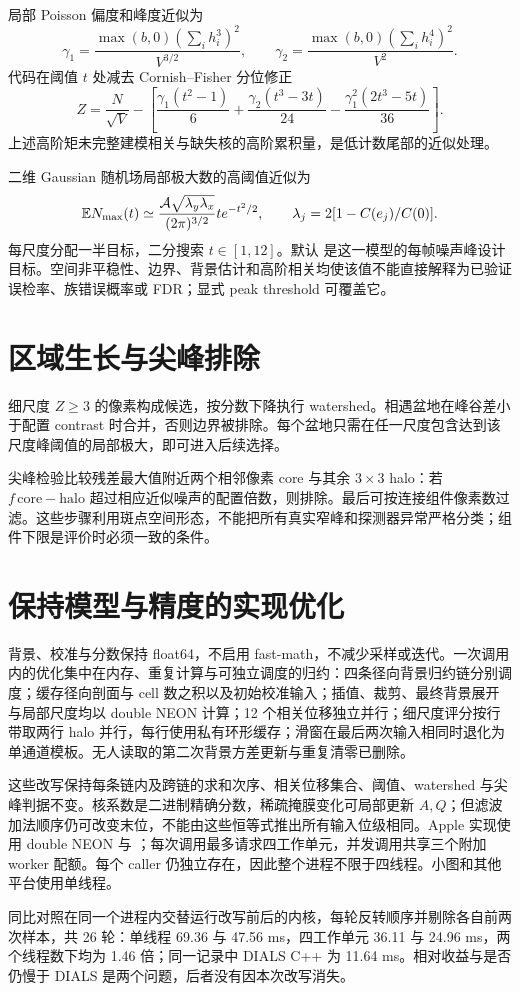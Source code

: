 局部 Poisson 偏度和峰度近似为
\begin{equation}
\gamma_1=\frac{\max(b,0)(\sum_i h_i^3)^2}{V^{3/2}},\qquad
\gamma_2=\frac{\max(b,0)(\sum_i h_i^4)^2}{V^2}.
\end{equation}
代码在阈值 $t$ 处减去 Cornish--Fisher 分位修正
\begin{equation}
Z=\frac{N}{\sqrt V}-\left[
\frac{\gamma_1(t^2-1)}6+\frac{\gamma_2(t^3-3t)}{24}
-\frac{\gamma_1^2(2t^3-5t)}{36}\right].
\end{equation}
上述高阶矩未完整建模相关与缺失核的高阶累积量，是低计数尾部的近似处理。

二维 Gaussian 随机场局部极大数的高阈值近似为
\begin{equation}
\mathbb E N_{\max}(t)\simeq\frac{\mathcal A\sqrt{\lambda_y\lambda_x}}{(2\pi)^{3/2}}
t e^{-t^2/2},\qquad \lambda_j=2[1-C(e_j)/C(0)].
\end{equation}
每尺度分配一半目标，二分搜索 $t\in[1,12]$。默认  是这一模型的每帧噪声峰设计目标。空间非平稳性、边界、背景估计和高阶相关均使该值不能直接解释为已验证误检率、族错误概率或 FDR；显式 peak threshold 可覆盖它。
\section{区域生长与尖峰排除}
细尺度 $Z\ge3$ 的像素构成候选，按分数下降执行 watershed。相遇盆地在峰谷差小于配置 contrast 时合并，否则边界被排除。每个盆地只需在任一尺度包含达到该尺度峰阈值的局部极大，即可进入后续选择。

尖峰检验比较残差最大值附近两个相邻像素 core 与其余 $3\times3$ halo：若 $f\,\mathrm{core}-\mathrm{halo}$ 超过相应近似噪声的配置倍数，则排除。最后可按连接组件像素数过滤。这些步骤利用斑点空间形态，不能把所有真实窄峰和探测器异常严格分类；组件下限是评价时必须一致的条件。
\section{保持模型与精度的实现优化}
背景、校准与分数保持 float64，不启用 fast-math，不减少采样或迭代。一次调用内的优化集中在内存、重复计算与可独立调度的归约：四条径向背景归约链分别调度；缓存径向剖面与 cell 数之积以及初始校准输入；插值、裁剪、最终背景展开与局部尺度均以 double NEON 计算；12 个相关位移独立并行；细尺度评分按行带取两行 halo 并行，每行使用私有环形缓存；滑窗在最后两次输入相同时退化为单通道模板。无人读取的第二次背景方差更新与重复清零已删除。

这些改写保持每条链内及跨链的求和次序、相关位移集合、阈值、watershed 与尖峰判据不变。核系数是二进制精确分数，稀疏掩膜变化可局部更新 $A,Q$；但滤波加法顺序仍可改变末位，不能由这些恒等式推出所有输入位级相同。Apple 实现使用 double NEON 与 ；每次调用最多请求四工作单元，并发调用共享三个附加 worker 配额。每个 caller 仍独立存在，因此整个进程不限于四线程。小图和其他平台使用单线程。

同比对照在同一个进程内交替运行改写前后的内核，每轮反转顺序并剔除各自前两次样本，共 26 轮：单线程 69.36 与 47.56 ms，四工作单元 36.11 与 24.96 ms，两个线程数下均为 1.46 倍；同一记录中 DIALS C++ 为 11.64 ms。相对收益与是否仍慢于 DIALS 是两个问题，后者没有因本次改写消失。
